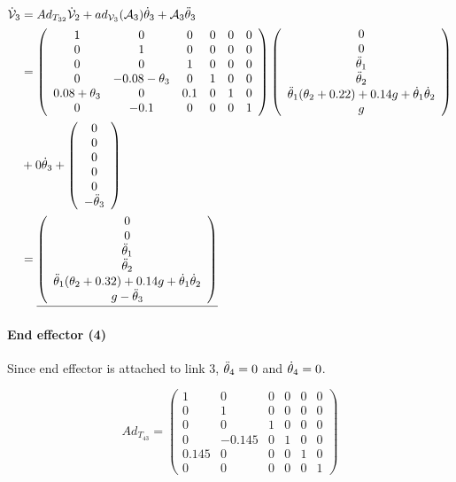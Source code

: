 \documentclass[]{scrreprt}
\newcommand{\myvec}[1]{\left(\begin{array}{c}#1\end{array}\right)}
\begin{document}
\begin{align*}
\vdot{3} &= Ad_{T_{32}}\vdot{2} + ad_{\mathcal{V}_3}(\mathcal{A}_3)\dot{\theta}_3+\mathcal{A}_3\ddot{\theta}_3\\
& = \left(\begin{array}{cccccc}
1 & 0 & 0 & 0 & 0 & 0 \\
0 & 1 & 0 & 0 & 0 & 0 \\
0 & 0 & 1 & 0 & 0 & 0 \\
0 & -0.08-\theta_3 & 0 & 1 & 0 & 0 \\
0.08+\theta_3 & 0 & 0.1 & 0 & 1 & 0 \\
0 & -0.1 & 0 & 0 & 0 & 1
\end{array}\right)
\myvec{0\\0\\\tddot{1}\\\tddot{2}\\\tddot{1}(\theta_2+0.22)+0.14g+\tdot{1}\tdot{2}\\g}\\
&+
0\tdot{3}+\myvec{0\\0\\0\\0\\0\\-\tddot{3}}\\
&= \underline{\myvec{0\\0\\\tddot{1}\\\tddot{2}\\\tddot{1}(\theta_2+0.32)+0.14g+\tdot{1}\tdot{2}\\g-\tddot{3}}}
\end{align*}    

\paragraph{End effector (4)}

Since end effector is attached to link 3, $\ddot{\theta}_{4} = 0$ and $\dot{\theta}_{4} = 0$.

\[
Ad_{T_{43}} = \left(\begin{array}{cccccc}
1 & 0 & 0 & 0 & 0 & 0 \\
0 & 1 & 0 & 0 & 0 & 0 \\
0 & 0 & 1 & 0 & 0 & 0 \\
0 & -0.145 & 0 & 1 & 0 & 0 \\
0.145 & 0 & 0 & 0 & 1 & 0 \\
0 & 0 & 0 & 0 & 0 & 1
\end{array}\right)
\]
\end{document}
